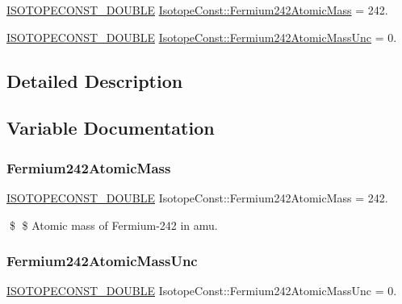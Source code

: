 \begin{DoxyCompactItemize}
\item 
\mbox{\hyperlink{group___isotope_const-_macros_ga8f45a7272ce02c0b4c65c44636ed719a}{I\+S\+O\+T\+O\+P\+E\+C\+O\+N\+S\+T\+\_\+\+D\+O\+U\+B\+LE}} \mbox{\hyperlink{group___isotope_const-_fermium-_fm242_ga16b1236126dce565a84ef43231e6f3c4}{Isotope\+Const\+::\+Fermium242\+Atomic\+Mass}} = 242.
\item 
\mbox{\hyperlink{group___isotope_const-_macros_ga8f45a7272ce02c0b4c65c44636ed719a}{I\+S\+O\+T\+O\+P\+E\+C\+O\+N\+S\+T\+\_\+\+D\+O\+U\+B\+LE}} \mbox{\hyperlink{group___isotope_const-_fermium-_fm242_gac7f9ab5385e99f8d47966cf3f86d2637}{Isotope\+Const\+::\+Fermium242\+Atomic\+Mass\+Unc}} = 0.
\end{DoxyCompactItemize}


\subsection{Detailed Description}


\subsection{Variable Documentation}
\mbox{\label{group___isotope_const-_fermium-_fm242_ga16b1236126dce565a84ef43231e6f3c4}} 
\subsubsection{\texorpdfstring{Fermium242\+Atomic\+Mass}{Fermium242AtomicMass}}
{\footnotesize\ttfamily \mbox{\hyperlink{group___isotope_const-_macros_ga8f45a7272ce02c0b4c65c44636ed719a}{I\+S\+O\+T\+O\+P\+E\+C\+O\+N\+S\+T\+\_\+\+D\+O\+U\+B\+LE}} Isotope\+Const\+::\+Fermium242\+Atomic\+Mass = 242.}

\$ \$ Atomic mass of Fermium-\/242 in amu. \mbox{\label{group___isotope_const-_fermium-_fm242_gac7f9ab5385e99f8d47966cf3f86d2637}} 
\subsubsection{\texorpdfstring{Fermium242\+Atomic\+Mass\+Unc}{Fermium242AtomicMassUnc}}
{\footnotesize\ttfamily \mbox{\hyperlink{group___isotope_const-_macros_ga8f45a7272ce02c0b4c65c44636ed719a}{I\+S\+O\+T\+O\+P\+E\+C\+O\+N\+S\+T\+\_\+\+D\+O\+U\+B\+LE}} Isotope\+Const\+::\+Fermium242\+Atomic\+Mass\+Unc = 0.}

